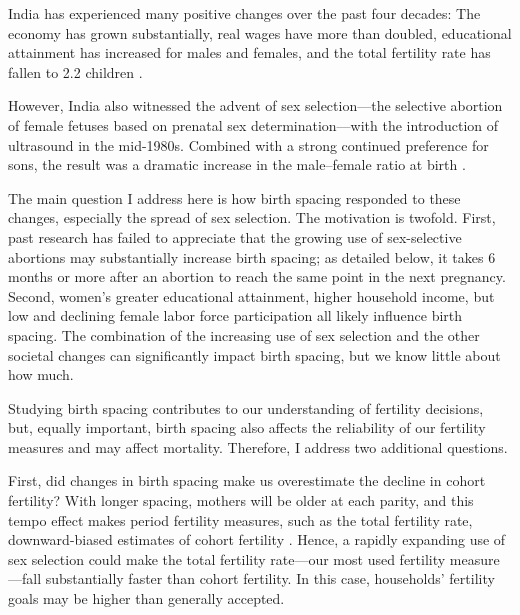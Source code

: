 \documentclass[12pt,letterpaper]{article}
\begin{document}
India has experienced many positive changes over the past four decades:
The economy has grown substantially,
real wages have more than doubled,
educational attainment has increased for males and females,
and the total fertility rate has fallen to 2.2 children
\citep{Bosworth2008,Dharmalingam2014,Klasen2015,
International-Institute-for-Population-Sciences-IIPS2017}.

However, India also witnessed the advent of sex selection---the selective abortion of 
female fetuses based on prenatal sex determination---with the introduction of ultrasound 
in the mid-1980s.
Combined with a strong continued preference for sons, the result was a dramatic increase 
in the male--female ratio at birth
\citep{das_gupta97,Arnold2002,retherford03b,Guilmoto2012,Portner2015b,Jayachandran2017}.


The main question I address here is how birth spacing responded to these changes, 
especially the spread of sex selection. 
The motivation is twofold.
First, past research has failed to appreciate that the growing use of sex-selective 
abortions may substantially increase birth spacing; as detailed below, it takes 6 months 
or more after an abortion to reach the same point in the next pregnancy.
Second, women's greater educational attainment, higher household income, but low and 
declining female labor force participation all likely influence birth spacing. 
The combination of the increasing use of sex selection and the other societal changes 
can significantly impact birth spacing, but we know little about how much.

Studying birth spacing contributes to our understanding of fertility decisions, but, equally 
important, birth spacing also affects the reliability of our fertility measures and may 
affect mortality. 
Therefore, I address two additional questions. 

First, did changes in birth spacing make us overestimate the decline in cohort fertility?
With longer spacing, mothers will be older at each parity, and this tempo effect 
makes period fertility measures, such as the total fertility rate, downward-biased
estimates of cohort fertility \citep{Hotz1997,Bongaarts1999,Ni-Bhrolchain2011}.
Hence, a rapidly expanding use of sex selection could make the total fertility rate---our 
most used fertility measure---fall substantially faster than cohort fertility.
In this case, households' fertility goals may be higher than generally accepted.
\end{document}
